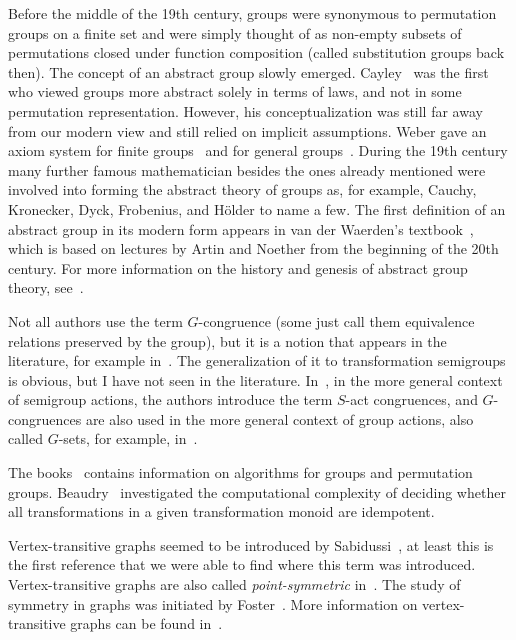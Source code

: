 Before the middle of the 19th century, 
groups were synonymous to permutation groups on a finite set
and were simply thought of as non-empty subsets of permutations closed under function composition (called substitution groups back then). The concept of an abstract group slowly emerged.
Cayley~\cite{Cayley54a,Cayley54b,Cayley59} was the first who
viewed groups more abstract solely in terms of laws, and not in some permutation representation.
However, his conceptualization was still far away from our modern view and still relied
on implicit assumptions. Weber gave an axiom system
for finite groups~\cite{Weber1882_MathAnn} and for general groups~\cite{Weber1896_LehrbuchAlgebra_Vol2}. 
During the 19th century many further famous mathematician besides the ones already mentioned 
were involved into forming
the abstract theory of groups as, for example, Cauchy, Kronecker, Dyck, Frobenius, and Hölder
to name a few. The first definition of an abstract group
in its modern form appears in van der Waerden's textbook~\cite{vanderWaerden_ModernAlgebra_SpringerArchive}, which is based
on lectures by Artin and Noether from the beginning of the 20th century.
For more information on the history and genesis of abstract group theory, see~\cite{Kleiner2007_HistoryAbstractAlgebra,Neumann_AbstractGroups_MacTutor,Wussing1984_GenesisAbstractGroup}.

Not all authors use the term $G$-congruence (some just call them equivalence relations preserved by the group), 
but it is a notion that appears in the literature, for example in~\cite{Burness14}.
The generalization of it to transformation semigroups is obvious, but I have not
seen in the literature. In~\cite{KilpKnauerMikhalev2000_MonoidsActs}, in the more general context
of semigroup actions, the authors introduce the term $S$-act congruences,
and $G$-congruences are also used in the more general context of group actions, also called $G$-sets,
for example, in~\cite{NeumannStoyThompson1994GroupsAndGeometry}.

The books~\cite{Seress2003PermutationGroupAlgorithms,Butler1991AlgorithmsPermutationGroups,Holt2005_ComputationalGroupTheory} contains information on algorithms for groups and permutation groups. Beaudry~\cite{Beaudry1989CharacterizationIdempotentTM} 
investigated the computational complexity of deciding whether all transformations in a 
given transformation monoid are idempotent.

Vertex-transitive graphs seemed to be introduced
by Sabidussi~\cite{sabidussi1964vertex}, at least this is the first reference
that we were able to find where this term was introduced.
Vertex-transitive graphs are also called \emph{point-symmetric} 
in~\cite{harary1969graph}.
The study of symmetry in graphs was initiated 
by Foster~\cite{foster1932geometrical}.
More information on vertex-transitive graphs
can be found in~\cite{BabaiSurvey96,Biggs1993,Cameron2004_AutomorphismsOfGraphs,PraegerLiNiemeyer1997_FiniteTransitivePermutationGroups}.

